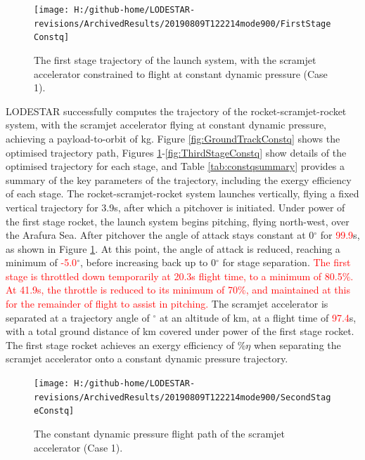 \begin{figure}[ht!] %
	\centering
	\texttt{[image: H:/github-home/LODESTAR-revisions/ArchivedResults/20190809T122214mode900/FirstStageConstq]}
	\caption{The first stage trajectory of the launch system, with the scramjet accelerator constrained to flight at constant dynamic pressure (Case 1).}
	\label{fig:FirstStageConstq}
\end{figure}
LODESTAR successfully computes the trajectory of the rocket-scramjet-rocket system, with the scramjet accelerator flying at constant dynamic pressure, achieving a payload-to-orbit of \PayloadToOrbitConstqNoReturn kg.
Figure \ref{fig:GroundTrackConstq} shows the optimised trajectory path, Figures \ref{fig:FirstStageConstq}-\ref{fig:ThirdStageConstq} show details of the optimised trajectory for each stage, and Table \ref{tab:constqsummary} provides a summary of the key parameters of the trajectory, including the exergy efficiency of each stage.
The rocket-scramjet-rocket system launches vertically, flying a fixed vertical trajectory for 3.9s, after which a pitchover is initiated. Under power of the first stage rocket, the launch system begins pitching, flying north-west, over the Arafura Sea. 
After pitchover the angle of attack stays constant at 0$^\circ$ for \textcolor{red}{99.9}s, as shown in Figure \ref{fig:FirstStageConstq}. At this point, the angle of attack is reduced, reaching a minimum of \textcolor{red}{-5.0}$^\circ$, before increasing back up to 0$^\circ$ for stage separation. \textcolor{red}{The first stage is throttled down temporarily at 20.3s flight time, to a minimum of 80.5\%. At 41.9s, the throttle is reduced to its minimum of 70\%, and maintained at this for the remainder of flight to assist in pitching. }
The scramjet accelerator is separated at a trajectory angle of \firstsecondSeparationgammaConstqNoReturn$^\circ$ at an altitude of \firstsecondSeparationAltConstqNoReturn km, at a flight time of \textcolor{red}{97.4}s, with a total ground distance of \FirstStageDistStandardNoReturn km covered under power of the first stage rocket. 
The first stage rocket achieves an exergy efficiency of \firstExergyEffConstqNoReturn\%$\eta$ when separating the scramjet accelerator onto a constant dynamic pressure trajectory. 


\begin{figure}[ht!]%
\centering
\texttt{[image: H:/github-home/LODESTAR-revisions/ArchivedResults/20190809T122214mode900/SecondStageConstq]}
\caption{The constant dynamic pressure flight path of the scramjet accelerator (Case 1).}
\label{fig:SecondStageConstq}
\end{figure}


